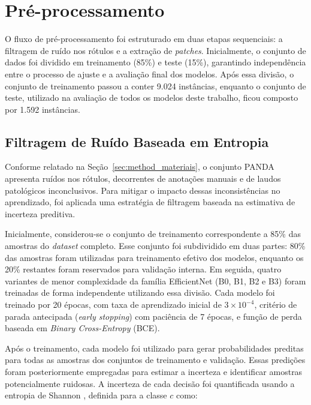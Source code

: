 \section{Pré-processamento}
\label{sec:pre}

O fluxo de pré-processamento foi estruturado em duas etapas sequenciais: a filtragem de ruído nos rótulos e a extração de \textit{patches}. Inicialmente, o conjunto de dados foi dividido em treinamento (85\%) e teste (15\%), garantindo independência entre o processo de ajuste e a avaliação final dos modelos. Após essa divisão, o conjunto de treinamento passou a conter 9.024 instâncias, enquanto o conjunto de teste, utilizado na avaliação de todos os modelos deste trabalho, ficou composto por 1.592 instâncias.


\subsection{Filtragem de Ruído Baseada em Entropia}
\label{sub:entropia}

Conforme relatado na Seção~\ref{sec:method_materiais}, o conjunto PANDA apresenta ruídos nos rótulos, decorrentes de anotações manuais e de laudos patológicos inconclusivos. Para mitigar o impacto dessas inconsistências no aprendizado, foi aplicada uma estratégia de filtragem baseada na estimativa de incerteza preditiva.

Inicialmente, considerou-se o conjunto de treinamento correspondente a 85\% das amostras do \textit{dataset} completo. Esse conjunto foi subdividido em duas partes: 80\% das amostras foram utilizadas para treinamento efetivo dos modelos, enquanto os 20\% restantes foram reservados para validação interna. Em seguida, quatro variantes de menor complexidade da família EfficientNet (B0, B1, B2 e B3) foram treinadas de forma independente utilizando essa divisão. Cada modelo foi treinado por 20 épocas, com taxa de aprendizado inicial de $3 \times 10^{-4}$, critério de parada antecipada (\textit{early stopping}) com paciência de 7 épocas, e função de perda baseada em \textit{Binary Cross-Entropy} (BCE).

Após o treinamento, cada modelo foi utilizado para gerar probabilidades preditas para todas as amostras dos conjuntos de treinamento e validação. Essas predições foram posteriormente empregadas para estimar a incerteza e identificar amostras potencialmente ruidosas.
A incerteza de cada decisão foi quantificada usando a entropia de Shannon \cite{ali2023entropy}, definida para a classe $c$ como:

